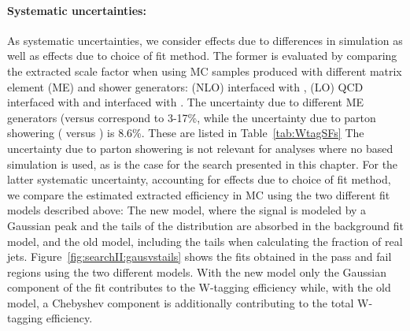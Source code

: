 \paragraph{Systematic uncertainties:}
As systematic uncertainties, we consider effects due to differences in \ttbar simulation as well as effects due to choice of fit method. The former is evaluated by comparing the extracted scale factor when using \ttbar MC samples produced with different matrix element (ME) and shower generators: \POWHEG (NLO) interfaced with  , \MADGRAPH (LO) QCD interfaced with \HERWIG{++} and \POWHEG interfaced with \HERWIG{++}.
The uncertainty due to different ME generators (\POWHEG versus \MADGRAPH correspond to 3-17\%, while the uncertainty due to parton showering ( versus \HERWIG{++}) is 8.6\%. These are listed in Table~\ref{tab:WtagSFs}
The uncertainty due to parton showering is not relevant for analyses where no \HERWIG{++} based simulation is used, as is the case for the search presented in this chapter.
For the latter systematic uncertainty, accounting for effects due to choice of fit method, we compare the estimated extracted efficiency in \ttbar MC using the two different fit models described above: The new model, where the signal is modeled by a Gaussian peak and the tails of the distribution are absorbed in the background fit model, and the old model, including the tails when calculating the fraction of real \PW jets. Figure~\ref{fig:searchII:gausvstails} shows the fits obtained in the pass and fail regions using the two different models. With the new model only the Gaussian component of the fit contributes to the W-tagging efficiency while, with the old model, a Chebyshev component is additionally contributing to the total W-tagging efficiency.
